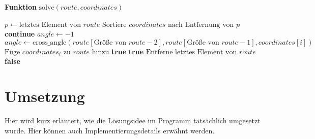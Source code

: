 \documentclass[a4paper,10pt,ngerman]{scrartcl}
\begin{document}
\textbf{Funktion} $\text{solve}(route, coordinates)$
\begin{algorithmic}[1]
\State $p \gets \text{letztes Element von } route$
\State $\text{Sortiere } coordinates \text{ nach Entfernung von } p$
\EndIf
{}
\State \textbf{continue}
\EndIf
\State $angle \gets -1$
\State $angle \gets \text{cross_angle}(route[\text{Größe von }route-2], route[\text{Größe von }route-1], coordinates[i])$
\EndIf
{}
\State $\text{Füge } coordinates_i \text{ zu } route \text{ hinzu}$
\State \Return \textbf{true}
\EndIf
{}
\State \Return \textbf{true}
\Else
\State $\text{Entferne letztes Element von } route$
\EndIf
\EndIf
\EndFor
\State \Return \textbf{false}
\end{algorithmic}

    \newpage
    \section{Umsetzung}\label{sec:umsetzung}
    Hier wird kurz erläutert, wie die Lösungsidee im Programm tatsächlich umgesetzt wurde.
    Hier können auch Implementierungsdetails erwähnt werden.
\end{document}
